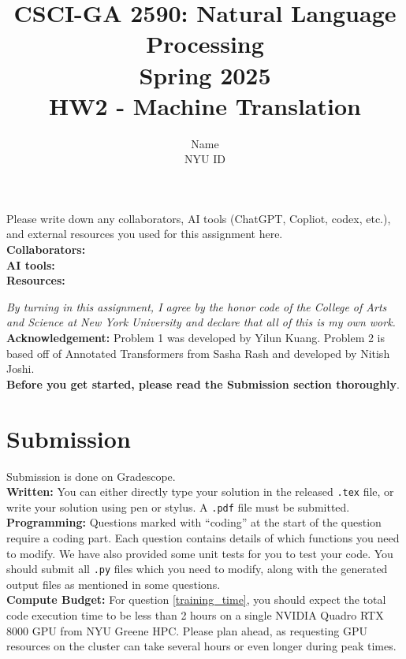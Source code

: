 \documentclass{article}
\title{\textbf{CSCI-GA 2590: Natural Language Processing\\ Spring 2025}\\HW2 - Machine Translation}
\author{Name \\
NYU ID}
\date{}
\theoremstyle{case}
\theoremstyle{definition}
\begin{document}
\maketitle
\begin{tcolorbox}
Please write down any collaborators, AI tools (ChatGPT, Copliot, codex, etc.), and external resources you used for this assignment here. \\
\textbf{Collaborators:} \\
\textbf{AI tools:} \\
\textbf{Resources:} 
\end{tcolorbox}

\textit{By turning in this assignment, I agree by the honor code of the College of Arts and Science at New York University and declare
that all of this is my own work.} \\

\textbf{Acknowledgement:} Problem 1 was developed by Yilun Kuang. Problem 2 is based off of Annotated Transformers from Sasha Rash and developed by Nitish Joshi. \\

\textbf{Before you get started, please read the Submission section thoroughly}.

\section*{Submission}
Submission is done on Gradescope. \\

\textbf{Written:} You can either directly type your solution in the released \texttt{.tex} file,
or write your solution using pen or stylus. 
A \texttt{.pdf} file must be submitted.\\

\textbf{Programming:} Questions marked with ``coding'' at the start of the question require a coding part. Each question contains details of which functions you need to modify. We have also provided some unit tests for you to test your code. You should submit all \texttt{.py} files which you need to modify, along with the generated output files as mentioned in some questions. \\

\textbf{Compute Budget:} For question \ref{training_time}, you should expect the total code execution time to be less than 2 hours on a single NVIDIA Quadro RTX 8000 GPU from NYU Greene HPC. Please plan ahead, as requesting GPU resources on the cluster can take several hours or even longer during peak times. \\
\end{document}
